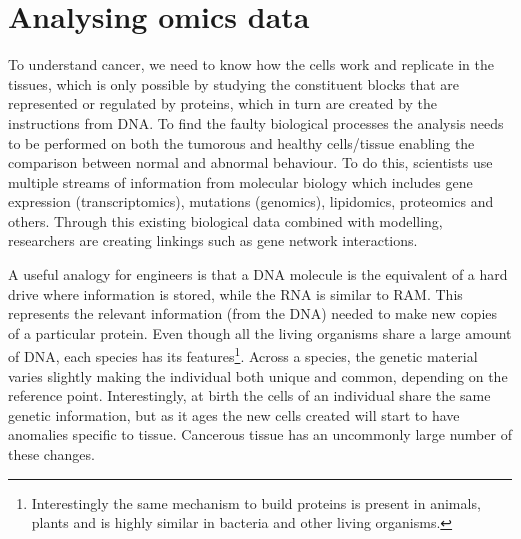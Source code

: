
\section{Analysing omics data} \label{s:lit:multi-omics}


To understand cancer, we need to know how the cells work and replicate in the tissues, which is only possible by studying the constituent blocks that are represented or regulated by proteins, which in turn are created by the instructions from DNA. To find the faulty biological processes the analysis needs to be performed on both the tumorous and healthy cells/tissue enabling the comparison between normal and abnormal behaviour. To do this, scientists use multiple streams of information from molecular biology which includes gene expression (transcriptomics), mutations (genomics), lipidomics, proteomics and others. Through this existing biological data combined with modelling, researchers are creating linkings such as gene network interactions. 

A useful analogy for engineers is that a DNA molecule is the equivalent of a hard drive where information is stored, while the RNA is similar to RAM. This represents the relevant information (from the DNA) needed to make new copies of a particular protein. Even though all the living organisms share a large amount of DNA, each species has its features\footnote{Interestingly the same mechanism to build proteins is present in animals, plants and is highly similar in bacteria and other living organisms.}. Across a species, the genetic material varies slightly making the individual both unique and common, depending on the reference point. Interestingly, at birth the cells of an individual share the same genetic information, but as it ages the new cells created will start to have anomalies specific to tissue. Cancerous tissue has an uncommonly large number of these changes.


